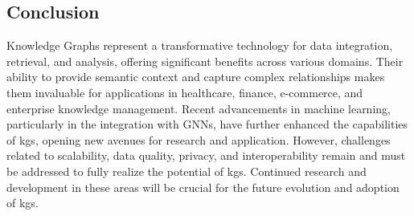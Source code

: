 \subsection*{Conclusion}
Knowledge Graphs represent a transformative technology for data integration, retrieval, and analysis, offering significant benefits across various domains. Their ability to provide semantic context and capture complex relationships makes them invaluable for applications in healthcare, finance, e-commerce, and enterprise knowledge management. Recent advancements in machine learning, particularly in the integration with GNNs, have further enhanced the capabilities of \glspl{kg}, opening new avenues for research and application. However, challenges related to scalability, data quality, privacy, and interoperability remain and must be addressed to fully realize the potential of \glspl{kg}. Continued research and development in these areas will be crucial for the future evolution and adoption of \glspl{kg}.